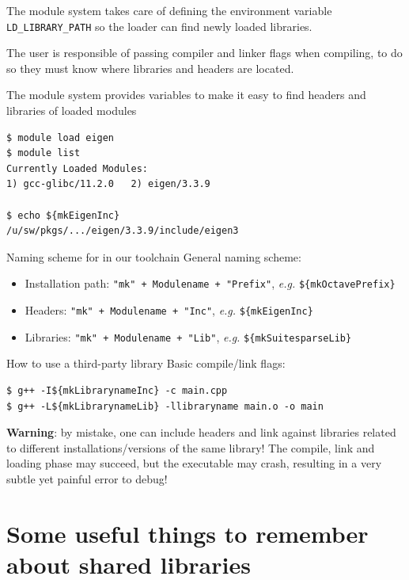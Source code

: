 \documentclass[10pt,aspectratio=169]{beamer}
\begin{document}
\begin{frame}[fragile]

  The module system takes care of defining the environment variable \texttt{LD\_LIBRARY\_PATH} so the loader can find newly loaded libraries.

  The user is responsible of passing compiler and linker flags when compiling, to do so they must know where libraries and headers are located.

  The module system provides variables to make it easy to find headers and libraries of loaded modules

\begin{verbatim}
$ module load eigen
$ module list
Currently Loaded Modules:
1) gcc-glibc/11.2.0   2) eigen/3.3.9

$ echo ${mkEigenInc}
/u/sw/pkgs/.../eigen/3.3.9/include/eigen3
\end{verbatim}
\end{frame}

\begin{frame}{Naming scheme for in our toolchain}
General naming scheme: 
\begin{itemize}
\item Installation path: \texttt{"mk" + Modulename + "Prefix"}, \textit{e.g.} \texttt{\$\{mkOctavePrefix\}}
\item Headers: \texttt{"mk" + Modulename + "Inc"}, \textit{e.g.} \texttt{\$\{mkEigenInc\}}
\item Libraries: \texttt{"mk" + Modulename + "Lib"}, \textit{e.g.} \texttt{\$\{mkSuitesparseLib\}}
\end{itemize}

\end{frame}

\begin{frame}[fragile]{How to use a third-party library}
  Basic compile/link flags:
\begin{verbatim}
$ g++ -I${mkLibrarynameInc} -c main.cpp
$ g++ -L${mkLibrarynameLib} -llibraryname main.o -o main
\end{verbatim}
\bigskip
\textbf{Warning}: by mistake, one can include headers and link against libraries related to different installations/versions of the same library! The compile, link and loading phase may succeed, but the executable may crash, resulting in a very subtle yet painful error to debug!
\end{frame}

\section{Some useful things to remember about shared libraries}
\end{document}
